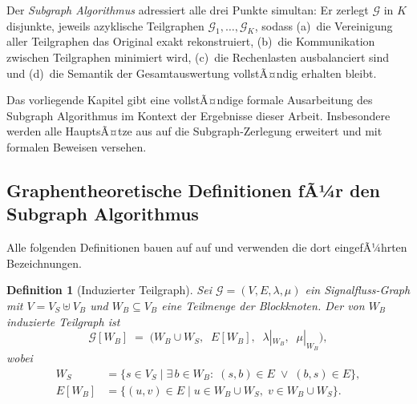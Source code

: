﻿\documentclass[12pt,a4paper]{article}
\newtheorem{definition}[theorem]{Definition}
\theoremstyle{definition}
\begin{document}
Der \emph{Subgraph Algorithmus} \cite{subgraph2026} adressiert alle drei
Punkte simultan: Er zerlegt $\mathcal{G}$ in $K$ disjunkte, jeweils
azyklische Teilgraphen $\mathcal{G}_1, \ldots, \mathcal{G}_K$, sodass
(a)~die Vereinigung aller Teilgraphen das Original exakt rekonstruiert,
(b)~die Kommunikation zwischen Teilgraphen minimiert wird,
(c)~die Rechenlasten ausbalanciert sind und
(d)~die Semantik der Gesamtauswertung vollstÃ¤ndig erhalten bleibt.

Das vorliegende Kapitel gibt eine vollstÃ¤ndige formale Ausarbeitung des
Subgraph Algorithmus im Kontext der Ergebnisse dieser Arbeit. Insbesondere
werden alle HauptsÃ¤tze aus
auf die Subgraph-Zerlegung erweitert und mit formalen Beweisen versehen.

\subsection{Graphentheoretische Definitionen fÃ¼r den Subgraph Algorithmus}
\label{subsec:subgraph-def}

Alle folgenden Definitionen bauen auf  auf und verwenden
die dort eingefÃ¼hrten Bezeichnungen.

\begin{definition}[Induzierter Teilgraph]
\label{def:induced}
Sei $\mathcal{G} = (V, E, \lambda, \mu)$ ein Signalfluss-Graph mit
$V = V_S \uplus V_B$ und $W_B \subseteq V_B$ eine Teilmenge der Blockknoten.
Der von $W_B$ \emph{induzierte Teilgraph} ist
\[
  \mathcal{G}[W_B]
  \;=\;
  \bigl(W_B \cup W_S,\;\; E[W_B],\;\; \lambda|_{W_B},\;\; \mu|_{W_B}\bigr),
\]
wobei
\begin{align*}
  W_S    &= \bigl\{s \in V_S \;\big|\;
             \exists\, b \in W_B :\; (s,b) \in E \;\vee\; (b,s) \in E \bigr\}, \\
  E[W_B] &= \bigl\{(u,v) \in E \;\big|\;
             u \in W_B \cup W_S,\; v \in W_B \cup W_S \bigr\}.
\end{align*}
\end{definition}
\end{document}
